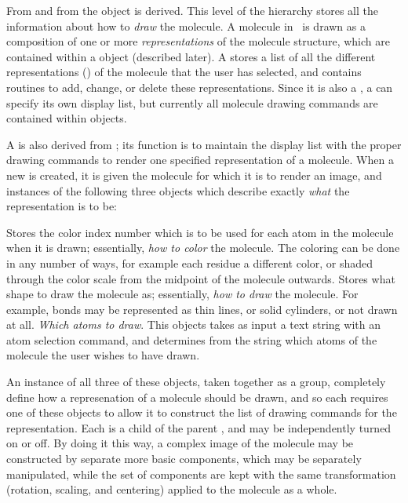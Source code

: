 From  and from  the  object is derived.  This level of the  hierarchy stores all the information about how to {\em draw} the molecule.  A molecule in \VMD\ is drawn as a composition of one or more {\em representations} of the molecule structure, which are contained within a  object (described later).  A   stores a list of all the different representations () of the molecule that the user has selected, and contains routines to add, change, or delete these representations.  Since it is also a , a  can specify its own display list, but currently all molecule drawing commands are contained within  objects.

A  is also derived from ; its function is to maintain the display list with the proper drawing commands to render one specified representation of a molecule.  When a new  is created, it is given the molecule for which it is to render an image, and instances of the following three objects which describe exactly {\em what} the representation is to be:
\begin{itemize}
Stores the color index number which is to be used for each atom in the molecule when it is drawn; essentially, {\em how to color} the molecule.  The coloring can be done in any number of ways, for example each residue a different color, or shaded through the color scale from the midpoint of the molecule outwards.
Stores what shape to draw the molecule as; essentially, {\em how to draw} the molecule.  For example, bonds may be represented as thin lines, or solid cylinders, or not drawn at all.
{\em Which atoms to draw}.  This objects takes as input a text string with an atom selection command, and determines from the string which atoms of the molecule the user wishes to have drawn.
\end{itemize}
An instance of all three of these objects, taken together as a group, completely define how a represenation of a molecule should be drawn, and so each  requires one of these objects to allow it to construct the list of drawing commands for the representation.  Each  is a child  of the parent , and may be independently turned on or off.  By doing it this way, a complex image of the molecule may be constructed by separate more basic components, which may be separately manipulated, while the set of components are kept with the same transformation (rotation, scaling, and centering) applied to the molecule as a whole.

